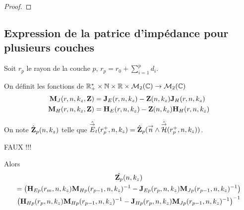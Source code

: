 \begin{proof}
    \end{proof}


  \subsection{Expression de la patrice d'impédance pour plusieurs couches}

    \begin{figure}[!hbt]
      \centering
      \begin{tikzpicture}
        
      \end{tikzpicture}
    \end{figure}

    Soit \(r_p\) le rayon de la couche \(p\), \(r_p = r_0 +\sum_{i=1}^{p} d_{i}\).

    On définit les fonctions de \(\RR_+^*\times \NN \times \RR \times \mathcal{M}_{2}(\CC) \rightarrow \mathcal{M}_{2}(\CC)\)
    \begin{subequations}
      \begin{align}
        \mM_{J}(r,n,k_z,\mZ) &= \mJ_{E}(r,n,k_z) -  \mZ(n,k_z) \mJ_{H}(r,n,k_z)
        \\
        \mM_{H}(r,n,k_z,\mZ) &= \mH_{E}(r,n,k_z) -  \mZ(n,k_z) \mH_{H}(r,n,k_z)
      \end{align}
    \end{subequations}

    \begin{thm}

      On note \(\hat\mZ_{p}(n,k_z)\) telle que \(\hat\vE_t(r_p^+,n,k_z) = \hat\mZ_{p}(\vn \pvect \hat\vH(r_p^+,n,k_z))\).


      FAUX !!!

      Alors
      \begin{multline}
        \hat{\mZ_p}(n,k_z) \\
          = \left(\mH_{Ep}(r_m,n,k_z)\mM_{Hp}(r_{p-1},n,k_z)^{-1} - \mJ_{Ep}(r_p,n,k_z)\mM_{Jp}(r_{p-1},n,k_z)^{-1}\right) 
          \\
          \left(\mH_{Hp}(r_p,n,k_z)\mM_{Hp}(r_{p-1},n,k_z)^{-1} - \mJ_{Hp}(r_p,n,k_z)\mM_{Jp}(r_{p-1},n,k_z)^{-1}\right)^{-1}
      \end{multline}
    \end{thm}


